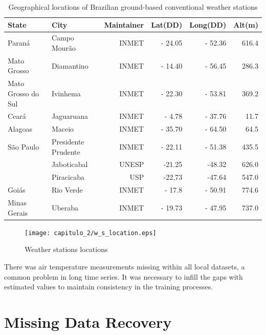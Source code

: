 \begin{table}[ht]
  \centering
  \caption{Geographical locations of Brazilian ground-based conventional weather stations}
  \label{tab:locais}
  \begin{center}
  \begin{tabular}{llrrrr}
  \hline
  State & City & Maintainer & Lat(DD) & Long(DD) & Alt(m)\\
  \hline
  Paraná & Campo Mourão & INMET & - 24.05 & - 52.36 & 616.4\\
  Mato Grosso & Diamantino & INMET & - 14.40 & - 56.45 & 286.3\\
  Mato Grosso do Sul & Ivinhema & INMET & - 22.30 & - 53.81 & 369.2\\
  Ceará & Jaguaruana & INMET & - 4.78 & - 37.76 & 11.7\\
  Alagoas & Maceio & INMET & - 35.70 & - 64.50 & 64.5\\
  São Paulo & Presidente Prudente & INMET & - 22.11 & - 51.38 & 435.5\\
  & Jaboticabal & UNESP & -21.25 & -48.32 & 626.0\\
  & Piracicaba & USP & -22,73 & -47.64 & 547.0\\
  Goiás & Rio Verde & INMET & - 17.8 & - 50.91 & 774.6\\
  Minas Gerais & Uberaba & INMET & - 19.73 & - 47.95 & 737.0\\\hline
  
  \end{tabular}
  \end{center}
    
\end{table}

\begin{figure}[htb!]
\begin{center}
 \texttt{[image: capitulo\_2/w\_s\_location.eps]}
 \caption{Weather stations locations}
 \label{img:figure1}
\end{center}
\end{figure}



There was air temperature measurements missing within all local datasets, a common problem in long time series. It was necessary to infill the gaps with estimated values to maintain consistency in the training processes.

\newpage
\section{Missing Data Recovery}
\label{sec:linux}

